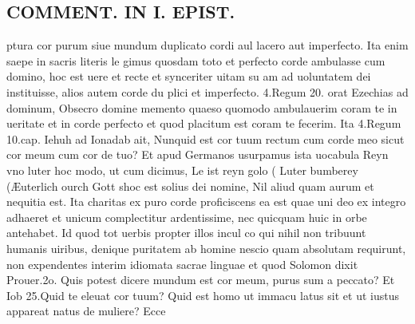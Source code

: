 \documentclass{article}
\begin{document}
\begin{pages}
\section*{COMMENT. IN I. EPIST. }\pstart ptura cor purum siue mundum duplicato cordi aul lacero aut imperfecto. Ita enim saepe in sacris literis le gimus quosdam toto et perfecto corde ambulasse cum domino, hoc est uere et recte et synceriter uitam su am ad uoluntatem dei instituisse, alios autem corde du plici et imperfecto. 4.Regum 20. orat Ezechias ad dominum, Obsecro domine memento quaeso quomodo ambulauerim coram te in ueritate et in corde perfecto et quod placitum est coram te fecerim. Ita 4.Regum 10.cap. Iehuh ad Ionadab ait, Nunquid est cor tuum rectum cum corde meo sicut cor meum cum cor de tuo? Et apud Germanos usurpamus ista uocabula Reyn vno luter hoc modo, ut cum dicimus, Le ist reyn golo ( Luter bumberey (Æuterlich ourch Gott shoc est solius dei nomine, Nil aliud quam aurum et nequitia est. Ita charitas ex puro corde proficiscens ea est quae uni deo ex integro adhaeret et unicum complectitur ardentissime, nec quicquam huic in orbe antehabet. Id quod tot uerbis propter illos incul co qui nihil non tribuunt humanis uiribus, denique puritatem ab homine nescio quam absolutam requirunt, non expendentes interim idiomata sacrae linguae et quod Solomon dixit Prouer.2o. Quis potest dicere mundum est cor meum, purus sum a peccato? Et Iob 25.Quid te eleuat cor tuum? Quid est homo ut immacu latus sit et ut iustus appareat natus de muliere? Ecce  \pend

\end{pages}
\end{document}
